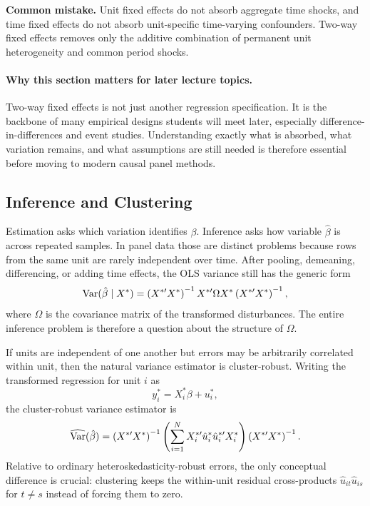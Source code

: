 \begin{boxF}
\textbf{Common mistake.}
Unit fixed effects do not absorb aggregate time shocks, and time fixed effects do not absorb unit-specific time-varying confounders. Two-way fixed effects removes only the additive combination of permanent unit heterogeneity and common period shocks.
\end{boxF}

\paragraph{Why this section matters for later lecture topics.}
Two-way fixed effects is not just another regression specification. It is the backbone of many empirical designs students will meet later, especially difference-in-differences and event studies. Understanding exactly what is absorbed, what variation remains, and what assumptions are still needed is therefore essential before moving to modern causal panel methods.

\subsection{Inference and Clustering}
Estimation asks which variation identifies $\beta$. Inference asks how variable $\hat{\beta}$ is across repeated samples. In panel data those are distinct problems because rows from the same unit are rarely independent over time. After pooling, demeaning, differencing, or adding time effects, the \ac{OLS} variance still has the generic form
\begin{equation}
\operatorname{Var}(\hat{\beta}\mid X^{\ast})
=
\left(X^{\ast\prime}X^{\ast}\right)^{-1}
X^{\ast\prime}\Omega X^{\ast}
\left(X^{\ast\prime}X^{\ast}\right)^{-1},
\label{eq:general_panel_var}
\end{equation}
where $\Omega$ is the covariance matrix of the transformed disturbances. The entire inference problem is therefore a question about the structure of $\Omega$.

If units are independent of one another but errors may be arbitrarily correlated within unit, then the natural variance estimator is cluster-robust. Writing the transformed regression for unit $i$ as
\[
y_i^{\ast}=X_i^{\ast}\beta+u_i^{\ast},
\]
the cluster-robust variance estimator is
\begin{equation}
\widehat{\operatorname{Var}}(\hat{\beta})
=
\left(X^{\ast\prime}X^{\ast}\right)^{-1}
\left(\sum_{i=1}^N X_i^{\ast\prime}\hat{u}_i^{\ast}\hat{u}_i^{\ast\prime}X_i^{\ast}\right)
\left(X^{\ast\prime}X^{\ast}\right)^{-1}.
\label{eq:cluster}
\end{equation}
Relative to ordinary heteroskedasticity-robust errors, the only conceptual difference is crucial: clustering keeps the within-unit residual cross-products $\hat{u}_{it}\hat{u}_{is}$ for $t\neq s$ instead of forcing them to zero.

